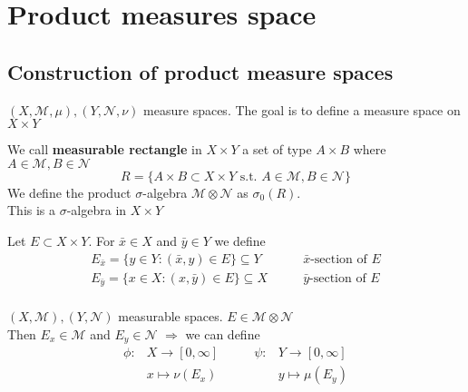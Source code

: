 \newpage
\section{Product measures space}
\subsection{Construction of product measure spaces}
\( (X, \mathcal{M}, \mu), (Y, \mathcal{N}, \nu) \) measure spaces.
The goal is to define a measure space on \(X \times Y\)
\begin{definition}
    We call \textbf{measurable rectangle} in \(X \times Y\) a set of type \(A \times B\) where \(A \in \mathcal{M}, B \in \mathcal{N}\)
    \[  R = \{ A \times B \subset X\times Y \text{ s.t. } A \in \mathcal{M}, B \in \mathcal{N}\}\]
    We define the product \(\sigma\)-algebra \(\mathcal{M} \otimes \mathcal{N}\) as \(\sigma_0(R)\). \\
    This is a \(\sigma\)-algebra in \(X \times Y\)
\end{definition}

\begin{definition}
    Let \(E \subset X \times Y \). For \( \bar{x} \in X \) and \(\bar{y} \in Y \) we define 
\[ 
    \begin{array}{ll}
        E_{\bar{x}} = \{ y \in Y: \left( \bar{x}, y \right) \in E \} \subseteq Y & \qquad \bar{x} \text{-section of } E \\
        E_{\bar{y}} = \{ x \in X: \left( x, \bar{y} \right) \in E \} \subseteq X & \qquad \bar{y} \mbox{-section of } E \\
    \end{array}
\]
\end{definition}

\begin{proposition}
    \(\left( X, \mathcal{M} \right), \left( Y, \mathcal{N} \right)\) measurable spaces. \(E \in \mathcal{M} \otimes \mathcal{N}\) \\
    Then \(E_x \in \mathcal{M} \) and \(E_y \in \mathcal{N} \) 
    \(\Rightarrow \) we can define 
    \[
    \begin{array}{rlrl}
        \phi : & X \rightarrow \left[ 0, \infty \right] & \qquad  \psi : &Y \rightarrow \left[ 0, \infty \right] \\
                & x \mapsto \nu(E_x) & & y \mapsto \mu(E_y) 
        
    \end{array}    
    \]
\end{proposition}



